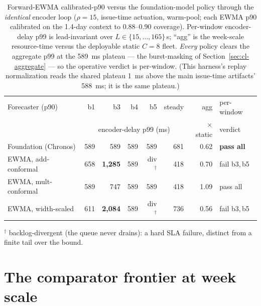 \begin{table}[htbp]
\centering
\caption[Forward-EWMA calibrated p90 versus the foundation-model
policy]{Forward-EWMA calibrated-p90 versus the foundation-model policy through
the \emph{identical} encoder loop ($\rho{=}15$, issue-time actuation,
warm-pool; each EWMA p90 calibrated on the 1.4-day context to 0.88--0.90
coverage). Per-window encoder-delay p99 is lead-invariant over
$L\in\{15,\ldots,165\}$\,s; ``agg'' is the week-scale resource-time versus the
deployable static $C{=}8$ fleet. \emph{Every} policy clears the aggregate p99
at the \SI{589}{\milli\second} plateau --- the burst-masking of
Section~\ref{sec:cl-aggregate} --- so the operative verdict is per-window.
(This harness's replay normalization reads the shared plateau
\SI{1}{\milli\second} above the main issue-time artifacts'
\SI{588}{\milli\second}; it is the same plateau.)}
\label{tab:cl-ewma}
\footnotesize
\setlength{\tabcolsep}{3pt}
\begin{tabular}{@{}lrrrrrrl@{}}
\toprule
Forecaster (p90) & b1 & b3 & b4 & b5 & steady & agg &
per-window \\
 & \multicolumn{5}{c}{encoder-delay p99 (\si{\milli\second})} &
$\times$static & verdict \\
\midrule
Foundation (Chronos)  & 589 & 589             & 589 & 589            & 681 & 0.62 & \textbf{pass all} \\
EWMA, add-conformal   & 658 & \textbf{1{,}285}& 589 & div$^\dagger$  & 418 & 0.70 & fail b3,\,b5 \\
EWMA, mult-conformal  & 589 & 747             & 589 & 589            & 418 & 1.09 & pass all \\
EWMA, width-scaled    & 611 & \textbf{2{,}084}& 589 & div$^\dagger$  & 736 & 0.56 & fail b3,\,b5 \\
\bottomrule
\end{tabular}

\vspace{2pt}
{\footnotesize $^\dagger$ backlog-divergent (the queue never drains): a hard
SLA failure, distinct from a finite tail over the bound.}
\end{table}

\section{The comparator frontier at week scale}
\label{sec:cl-aggregate}
\label{sec:cl-frontier}

